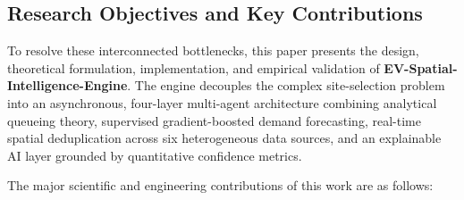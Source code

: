 \documentclass[preprint,12pt,authoryear]{elsarticle}
\begin{document}
\subsection{Research Objectives and Key Contributions}
To resolve these interconnected bottlenecks, this paper presents the design, theoretical formulation, implementation, and empirical validation of \textbf{EV-Spatial-Intelligence-Engine}. The engine decouples the complex site-selection problem into an asynchronous, four-layer multi-agent architecture combining analytical queueing theory, supervised gradient-boosted demand forecasting, real-time spatial deduplication across six heterogeneous data sources, and an explainable AI layer grounded by quantitative confidence metrics.

The major scientific and engineering contributions of this work are as follows:
\end{document}
